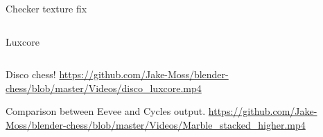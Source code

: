 \documentclass[presentation, 8pt]{beamer}
\begin{document}
\begin{frame}[label={sec:orgf2f1443}]{Checker texture fix}
\begin{columns}
\begin{column}{0.45\columnwidth}
\begin{block}{Luxcore}
\begin{center}
\end{center}
\end{block}
\end{column}
\end{columns}
\end{frame}
\begin{frame}[label={sec:orga69ccad}]{Disco chess!}
\url{https://github.com/Jake-Moss/blender-chess/blob/master/Videos/disco\_luxcore.mp4}
\end{frame}
\begin{frame}[label={sec:org5613876}]{Comparison between Eevee and Cycles output.}
\url{https://github.com/Jake-Moss/blender-chess/blob/master/Videos/Marble\_stacked\_higher.mp4}
\end{frame}
\end{document}
